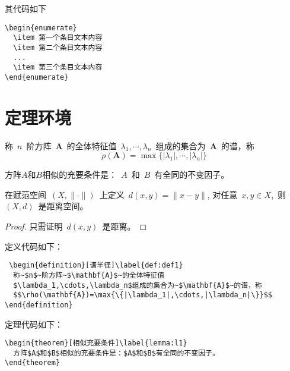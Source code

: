 其代码如下

\lstset{language=tex,tabsize=4}
\begin{lstlisting}
\begin{enumerate}
  \item 第一个条目文本内容
  \item 第二个条目文本内容
  ...
  \item 第三个条目文本内容
\end{enumerate}
\end{lstlisting}



\section{定理环境}

\begin{definition}[谱半径]\label{def:def1}
  称~$n$~阶方阵~$\mathbf{A}$~的全体特征值~$\lambda_1,\cdots,\lambda_n$~组成的集合为~$\mathbf{A}$~的谱，称
  $$\rho(\mathbf{A})=\max{\{|\lambda_1|,\cdots,|\lambda_n|\}}$$
\end{definition}
\begin{theorem}[相似充要条件]\label{lemma:l1}
  方阵$A$和$B$相似的充要条件是：~$A$~和~$B$~有全同的不变因子。
\end{theorem}
\begin{corollary}[推论1]\label{cor:cor1}
在赋范空间~$(X,\|\cdot\|)$~上定义~$d(x,y)=\|x-y\|$, 对任意~$x,y\in X$,~则~$(X,d)$~是距离空间。
\end{corollary}
\begin{proof}
  只需证明~$d(x,y)$~是距离。
\end{proof}
\newpage

定义代码如下：
\lstset{language=tex,tabsize=4}
\begin{lstlisting}
 \begin{definition}[谱半径]\label{def:def1}
  称~$n$~阶方阵~$\mathbf{A}$~的全体特征值
  $\lambda_1,\cdots,\lambda_n$组成的集合为~$\mathbf{A}$~的谱，称
  $$\rho(\mathbf{A})=\max{\{|\lambda_1|,\cdots,|\lambda_n|\}}$$
\end{definition}
\end{lstlisting}


定理代码如下：
\lstset{language=tex,tabsize=4}
\begin{lstlisting}
\begin{theorem}[相似充要条件]\label{lemma:l1}
  方阵$A$和$B$相似的充要条件是：$A$和$B$有全同的不变因子。
\end{theorem}
\end{lstlisting}



